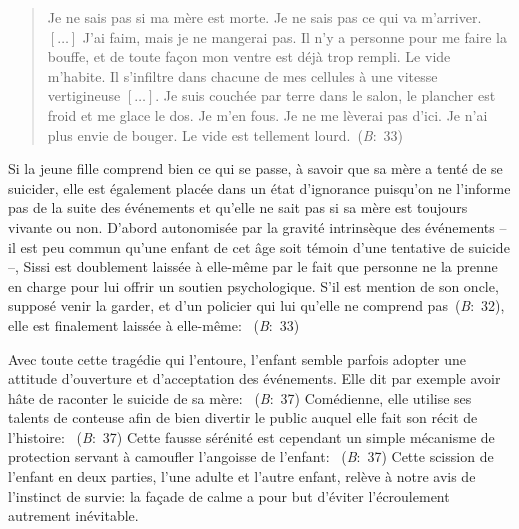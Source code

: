 \begin{quote}
  \begin{singlespace}
    \small
    Je ne sais pas si ma mère est morte. Je ne sais pas ce qui va m'arriver. $\left[ \dots \right]$ J'ai faim, mais je ne mangerai pas. Il n'y a personne pour me faire la bouffe, et de toute façon mon ventre est déjà trop rempli. Le vide m'habite. Il s'infiltre dans chacune de mes cellules à une vitesse vertigineuse $\left[ \dots \right]$. Je suis couchée par terre dans le salon, le plancher est froid et me glace le dos. Je m'en fous. Je ne me lèverai pas d'ici. Je n'ai plus envie de bouger. Le vide est tellement lourd.~(\textit{B}:~33)
    \normalsize
  \end{singlespace}
\end{quote}
Si la jeune fille comprend bien ce qui se passe, à savoir que sa mère a tenté de se suicider, elle est également placée dans un état d'ignorance puisqu'on ne l'informe pas de la suite des événements et qu'elle ne sait pas si sa mère est toujours vivante ou non.
D'abord autonomisée par la gravité intrinsèque des événements -- il est peu commun qu'une enfant de cet âge soit témoin d'une tentative de suicide --, Sissi est doublement laissée à elle-même par le fait que personne ne la prenne en charge pour lui offrir un soutien psychologique.
S'il est mention de son oncle, supposé venir la garder, et d'un policier qui lui  qu'elle ne comprend pas~(\textit{B}:~32), elle est finalement laissée à elle-même: ~(\textit{B}:~33)
\par
Avec toute cette tragédie qui l'entoure, l'enfant semble parfois adopter une attitude d'ouverture et d'acceptation des événements.
Elle dit par exemple avoir hâte de raconter le suicide de sa mère: ~(\textit{B}:~37)
Comédienne, elle utilise ses talents de conteuse afin de bien divertir le public auquel elle fait son récit de l'histoire:  ~(\textit{B}:~37)
Cette fausse sérénité est cependant un simple mécanisme de protection servant à camoufler l'angoisse de l'enfant: ~(\textit{B}:~37)
Cette scission de l'enfant en deux parties, l'une adulte et l'autre enfant, relève à notre avis de l'instinct de survie: la façade de calme a pour but d'éviter l'écroulement autrement inévitable.
